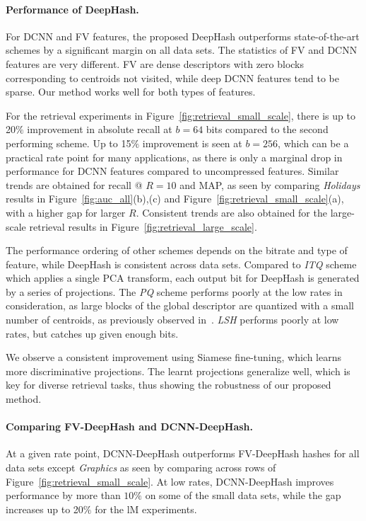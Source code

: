 \documentclass[10pt,twocolumn,letterpaper]{article}
\newcommand{\squishlist}{
 \begin{list}{$\bullet$}
  { \setlength{\itemsep}{0pt}
     \setlength{\parsep}{3pt}
     \setlength{\topsep}{3pt}
     \setlength{\partopsep}{0pt}
     \setlength{\leftmargin}{1.5em}
     \setlength{\labelwidth}{1em}
     \setlength{\labelsep}{0.5em}}}
\begin{document}
\vspace{-0.1em}
\paragraph{Performance of DeepHash.}
For DCNN and FV features, the proposed DeepHash outperforms state-of-the-art schemes by a significant margin on all data sets.
The statistics of FV and DCNN features are very different. 
FV are dense descriptors with zero blocks corresponding to centroids not visited, while deep DCNN features tend to be sparse.
Our method works well for both types of features.


For the retrieval experiments in Figure~\ref{fig:retrieval_small_scale}, there is up to 20$\%$ improvement in absolute recall at $b=64$ bits compared to the second performing scheme.
Up to 15$\%$ improvement is seen at $b=256$, which can be a practical rate point for many applications, as there is only a marginal drop in performance for DCNN features compared to uncompressed features.
Similar trends are obtained for recall @ $R=10$ and MAP, as seen by comparing {\it Holidays} results in Figure~\ref{fig:auc_all}(b),(c) and Figure~\ref{fig:retrieval_small_scale}(a), with a higher gap for larger $R$.
Consistent trends are also obtained for the large-scale retrieval results in Figure~\ref{fig:retrieval_large_scale}.

The performance ordering of other schemes depends on the bitrate and type of feature, while DeepHash is consistent across data sets.
Compared to {\it ITQ} scheme which applies a single PCA transform, each output bit for DeepHash is generated by a series of projections. 
The {\it PQ} scheme performs poorly at the low rates in consideration, as large blocks of the global descriptor are quantized with a small number of centroids, as previously observed in~\cite{BPBC}.
{\it LSH} performs poorly at low rates, but catches up given enough bits. 

We observe a consistent improvement using Siamese fine-tuning, which learns more discriminative projections.
The learnt projections generalize well, which is key for diverse retrieval tasks, thus showing the robustness of our proposed method.

\vspace{-0.1em}
\paragraph{Comparing FV-DeepHash and DCNN-DeepHash.}
At a given rate point, DCNN-DeepHash outperforms FV-DeepHash hashes for all data sets except {\it Graphics} as seen by comparing across rows of Figure~\ref{fig:retrieval_small_scale}.
At low rates, DCNN-DeepHash improves performance by more than $10\%$ on some of the small data sets, while the gap increases up to 20$\%$  for the lM experiments. 
\end{document}
